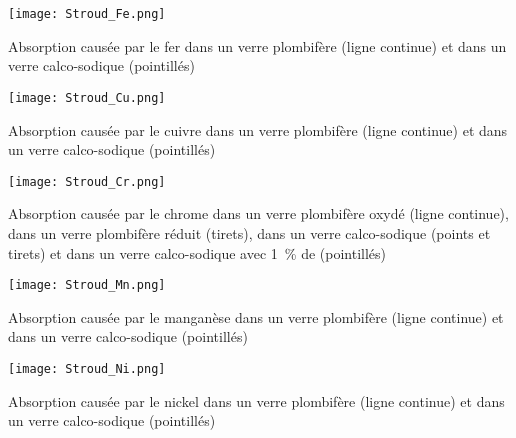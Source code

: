 \newpage

\noindent%
\begin{minipage}{0.47\textwidth}
  \texttt{[image: Stroud\_Fe.png]}%

  Absorption causée par le fer dans un verre plombifère 
  (ligne continue) et dans un verre calco-sodique (pointillés) 
  \autocite{Stroud_1971}
\end{minipage}%
\hfill%
\begin{minipage}{0.47\textwidth}
  \texttt{[image: Stroud\_Cu.png]}%

  Absorption causée par le cuivre dans un verre plombifère 
  (ligne continue) et dans un verre calco-sodique (pointillés) 
  \autocite{Stroud_1971}
\end{minipage}%

\noindent%
\begin{minipage}{0.47\textwidth}
  \texttt{[image: Stroud\_Cr.png]}%

  Absorption causée par le chrome dans un verre plombifère oxydé 
  (ligne continue), dans un verre plombifère réduit (tirets), 
  dans un verre calco-sodique (points et tirets) et dans un verre 
  calco-sodique avec \SI{1}{\percent} de  (pointillés)
  \autocite{Stroud_1971}
\end{minipage}%
\hfill%
\begin{minipage}{0.47\textwidth}
  \texttt{[image: Stroud\_Mn.png]}%

  Absorption causée par le manganèse dans un verre plombifère 
  (ligne continue) et dans un verre calco-sodique (pointillés) 
  \autocite{Stroud_1971}
\end{minipage}%

\noindent%
\begin{minipage}{0.47\textwidth}
  \texttt{[image: Stroud\_Ni.png]}%

  Absorption causée par le nickel dans un verre plombifère 
  (ligne continue) et dans un verre calco-sodique (pointillés) 
  \autocite{Stroud_1971}
\end{minipage}%
